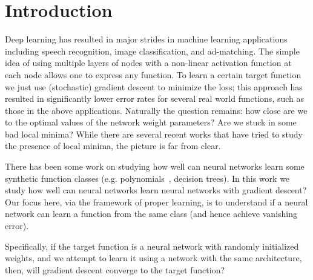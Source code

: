 \section{Introduction}


Deep learning has resulted in major strides in machine learning applications including speech recognition, image classification, and ad-matching. The simple idea of using multiple layers of nodes with a non-linear activation function at each node allows one to express any function.  To learn a certain target function we just use (stochastic) gradient descent to minimize the loss; this approach has resulted in significantly lower error rates for several real world functions, such as those in the above applications. Naturally the question remains: how close are we to the optimal values of the network weight parameters? Are we stuck in some bad local minima? While there are several recent works \cite{ChoromanskaHMAL14, DauphinPGCGB14, Kawaguchi16a} that have tried to study the presence of local minima, the picture is far from clear.

There has been some work on studying how well can neural networks
learn some synthetic function classes
(e.g. polynomials~\cite{valiant2014learning}, decision trees).  In
this work we study how well can neural networks learn neural networks
with gradient descent?  Our focus here, via the framework of proper
learning, is to understand if a neural network can learn a function
from the same class (and hence achieve vanishing error).

%
%

Specifically, if the target function is a neural network with randomly
initialized weights, and we attempt to learn it using a network with
the same architecture, then, will gradient descent converge to the
target function?





